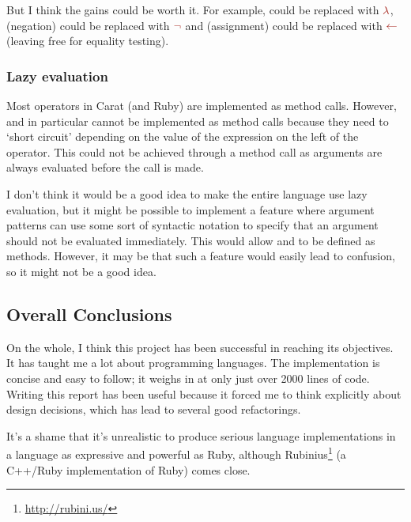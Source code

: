 But I think the gains could be worth it. For example,  could be replaced with $\color{Mahogany} \lambda$, \code{!} (negation) could be replaced with $\color{Mahogany} \neg$ and \code{=} (assignment) could be replaced with $\color{Mahogany} \leftarrow$ (leaving \code{=} free for equality testing).

\subsubsection{Lazy evaluation}

Most operators in Carat (and Ruby) are implemented as method calls. However, \code{&&} and \code{||} in particular cannot be implemented as method calls because they need to `short circuit' depending on the value of the expression on the left of the operator. This could not be achieved through a method call as arguments are always evaluated before the call is made.

I don't think it would be a good idea to make the entire language use lazy evaluation, but it might be possible to implement a feature where argument patterns can use some sort of syntactic notation to specify that an argument should not be evaluated immediately. This would allow \code{&&} and \code{||} to be defined as methods. However, it may be that such a feature would easily lead to confusion, so it might not be a good idea.

\subsection{Overall Conclusions}

On the whole, I think this project has been successful in reaching its objectives. It has taught me a lot about programming languages. The implementation is concise and easy to follow; it weighs in at only just over 2000 lines of code. Writing this report has been useful because it forced me to think explicitly about design decisions, which has lead to several good refactorings.

It's a shame that it's unrealistic to produce serious language implementations in a language as expressive and powerful as Ruby, although Rubinius\footnote{\url{http://rubini.us/}} (a C++/Ruby implementation of Ruby) comes close.
